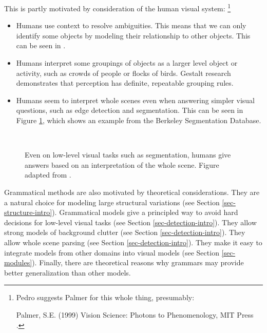 This is partly motivated by consideration of the human visual system:
\footnote{Pedro suggests Palmer for this whole thing, presumably:

  Palmer, S.E. (1999) Vision Science: Photons to Phenomenology, MIT
  Press .}  
\begin{itemize}
\item Humans use context to resolve ambiguities. \cite{visual-context}
  This means that we can only identify some objects by modeling their
  relationship to other objects. This can be seen in \cite{pop}.
\item Humans interpret some groupings of objects as a larger level
  object or activity, such as crowds of people or flocks of birds.
  Gestalt research demonstrates that perception has definite,
  repeatable grouping rules. \cite{gestalt}
\item Humans seem to interpret whole scenes even when answering
  simpler visual questions, such as edge detection and segmentation.
  This can be seen in Figure \ref{fig-bsd}, which shows an example
  from the Berkeley Segmentation Database. \cite{bsd}
\end{itemize}
\begin{figure}
  \centering
{}\\
\caption{Even on low-level visual tasks such as segmentation, humans
  give answers based on an interpretation of the whole scene. Figure
  adapted from \cite{bsd}.}
\label{fig-bsd}
\end{figure}

Grammatical methods are also motivated by theoretical
considerations. They are a natural choice for modeling large
structural variations (see Section \ref{sec-structure-intro}). Grammatical
models give a principled way to avoid hard decisions for low-level
visual tasks (see Section \ref{sec-detection-intro}). They allow strong models of
background clutter (see Section \ref{sec-detection-intro}). They allow whole
scene parsing (see Section \ref{sec-detection-intro}). They make it easy to
integrate models from other domains into visual models (see Section
\ref{sec-modules}). Finally, there are theoretical reasons why
grammars may provide better generalization than other models.


